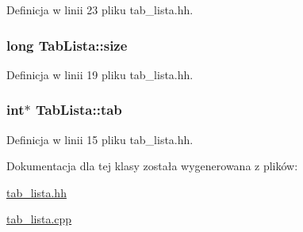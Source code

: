 Definicja w linii 23 pliku tab\-\_\-lista.\-hh.

\hypertarget{class_tab_lista_aa3c6d623be318ec8410fa447281380da}{
\subsubsection[{size}]{\setlength{\rightskip}{0pt plus 5cm}long Tab\-Lista\-::size\hspace{0.3cm}{\ttfamily [private]}}}\label{class_tab_lista_aa3c6d623be318ec8410fa447281380da}


Definicja w linii 19 pliku tab\-\_\-lista.\-hh.

\hypertarget{class_tab_lista_a06f658ed62f3db852813e90dcc5876a5}{
\subsubsection[{tab}]{\setlength{\rightskip}{0pt plus 5cm}int$\ast$ Tab\-Lista\-::tab\hspace{0.3cm}{\ttfamily [private]}}}\label{class_tab_lista_a06f658ed62f3db852813e90dcc5876a5}


Definicja w linii 15 pliku tab\-\_\-lista.\-hh.



Dokumentacja dla tej klasy została wygenerowana z plików\-:\begin{DoxyCompactItemize}
\item 
\hyperlink{tab__lista_8hh}{tab\-\_\-lista.\-hh}\item 
\hyperlink{tab__lista_8cpp}{tab\-\_\-lista.\-cpp}\end{DoxyCompactItemize}
